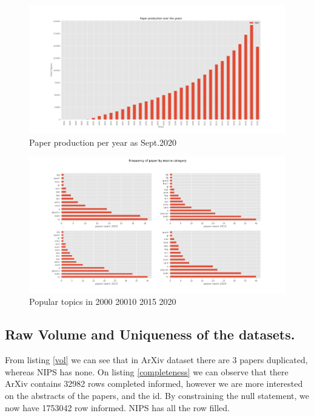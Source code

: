 \begin{figure}
\centering
\includegraphics[width=1\linewidth]{images/paper_prod}
\caption{Paper production per year as Sept.2020}
\label{fig:paper_prod}
\end{figure}


\begin{figure}
\centering
\includegraphics[width=1\linewidth]{images/paper_topics}
\caption{Popular topics in 2000 20010 2015 2020}
\label{fig:paper_topics}
\end{figure}

\subsection{Raw Volume and Uniqueness of the datasets.}

From listing \ref{vol} we can see that in ArXiv dataset there are 3 papers duplicated, whereas NIPS has none. On listing \ref{completeness}
we can observe that there ArXiv contains 32982 rows completed informed, however we are more interested on the abstracts of the papers, and the id. 
By constraining the null statement, we now have 1753042 row informed. NIPS has all the row filled. 

